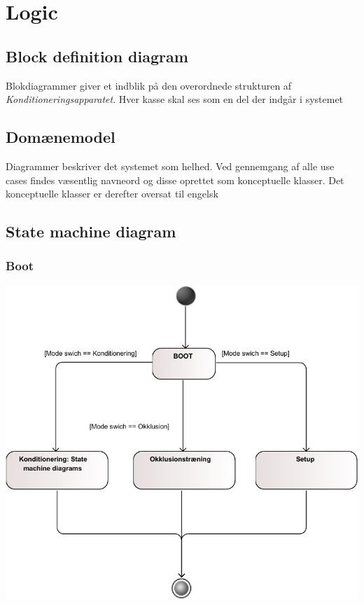 \section{Logic}

\subsection{Block definition diagram}
Blokdiagrammer giver et indblik på den overordnede strukturen af \textit{Konditioneringsapparatet}.  Hver kasse skal ses som en del der indgår i systemet

\subsection{Domænemodel}
Diagrammer beskriver det systemet som helhed. Ved gennemgang af alle use cases findes væsentlig navneord og disse oprettet som konceptuelle klasser. Det konceptuelle klasser er derefter oversat til engelsk

\subsection{State machine diagram}

\subsubsection{Boot}
\includegraphics[width=\textwidth]{pdfs/STM_BOOT-crop.pdf} 

